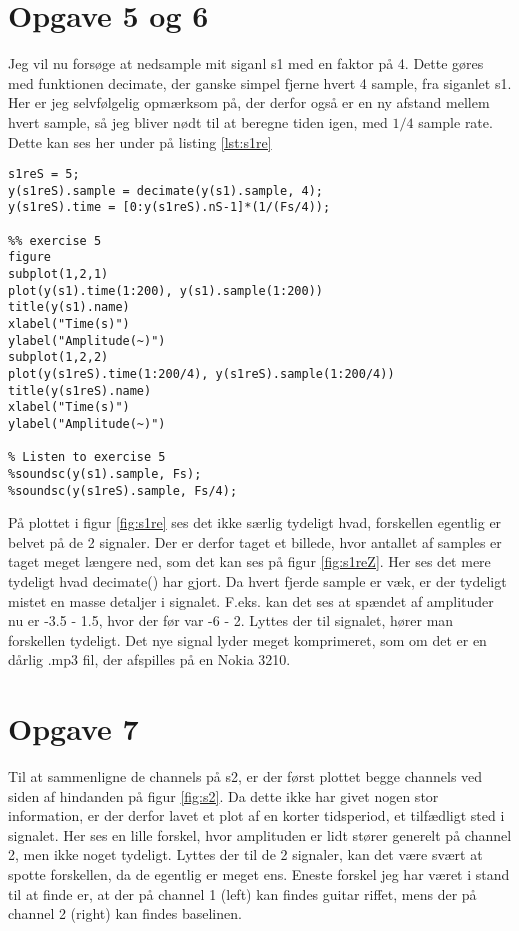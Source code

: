 \documentclass[../main.tex]{subfiles}
\begin{document}
\section*{Opgave 5 og 6}

Jeg vil nu forsøge at nedsample mit siganl s1 med en faktor på 4. Dette gøres med funktionen decimate, der ganske simpel fjerne hvert 4 sample, fra siganlet s1. Her er jeg selvfølgelig opmærksom på, der derfor også er en ny afstand mellem hvert sample, så jeg bliver nødt til at beregne tiden igen, med \( 1 / 4 \) sample rate. Dette kan ses her under på listing \ref{lst:s1re} 

\begin{lstlisting}[caption={Nedsampel af s1}, label={lst:s1re}]
s1reS = 5;
y(s1reS).sample = decimate(y(s1).sample, 4);
y(s1reS).time = [0:y(s1reS).nS-1]*(1/(Fs/4));

%% exercise 5
figure
subplot(1,2,1)
plot(y(s1).time(1:200), y(s1).sample(1:200))
title(y(s1).name)
xlabel("Time(s)")
ylabel("Amplitude(~)")
subplot(1,2,2)
plot(y(s1reS).time(1:200/4), y(s1reS).sample(1:200/4))
title(y(s1reS).name)
xlabel("Time(s)")
ylabel("Amplitude(~)")

% Listen to exercise 5
%soundsc(y(s1).sample, Fs);
%soundsc(y(s1reS).sample, Fs/4);
\end{lstlisting}


På plottet i figur \ref{fig:s1re} ses det ikke særlig tydeligt hvad, forskellen egentlig er belvet på de 2 signaler. Der er derfor taget et billede, hvor antallet af samples er taget meget længere ned, som det kan ses på figur \ref{fig:s1reZ}. Her ses det mere tydeligt hvad decimate() har gjort. Da hvert fjerde sample er væk, er der tydeligt mistet en masse detaljer i signalet. F.eks. kan det ses at spændet af amplituder nu er -3.5 - 1.5, hvor der før var -6 - 2. Lyttes der til signalet, hører man forskellen tydeligt. Det nye signal lyder meget komprimeret, som om det er en dårlig .mp3 fil, der afspilles på en Nokia 3210. 



\section*{Opgave 7}

Til at sammenligne de channels på s2, er der først plottet begge channels ved siden af hindanden på figur \ref{fig:s2}. Da dette ikke har givet nogen stor information, er der derfor lavet et plot af en korter tidsperiod, et tilfædligt sted i signalet. Her ses en lille forskel, hvor amplituden er lidt stører generelt på channel 2, men ikke noget tydeligt. Lyttes der til de 2 signaler, kan det være svært at spotte forskellen, da de egentlig er meget ens. Eneste forskel jeg har været i stand til at finde er, at der på channel 1 (left) kan findes guitar riffet, mens der på channel 2 (right) kan findes baselinen. 
\end{document}

